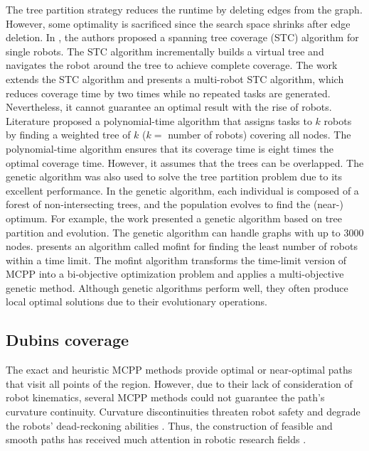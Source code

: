 \documentclass[journal,article,submit,pdftex,moreauthors]{Definitions/mdpi}
\begin{document}
The tree partition strategy reduces the runtime by deleting edges from the graph. However, some optimality is sacrificed since the search space shrinks after edge deletion. In \cite{gabriely2001spanning}, the authors proposed a spanning tree coverage (STC) algorithm for single robots. The STC algorithm incrementally builds a virtual tree and navigates the robot around the tree to achieve complete coverage. The work \cite{hazon2005redundancy} extends the STC algorithm and presents a multi-robot STC algorithm, which reduces coverage time by two times while no repeated tasks are generated. Nevertheless, it cannot guarantee an optimal result with the rise of robots. Literature \cite{zheng2005multi} proposed a polynomial-time algorithm that assigns tasks to $k$ robots by finding a weighted tree of $k$ ($k =$ number of robots) covering all nodes. The polynomial-time algorithm ensures that its coverage time is eight times the optimal coverage time. However, it assumes that the trees can be overlapped. The genetic algorithm was also used to solve the tree partition problem due to its excellent performance. In the genetic algorithm, each individual is composed of a forest of non-intersecting trees, and the population evolves to find the (near-) optimum. For example, the work \cite{c39} presented a genetic algorithm based on tree partition and evolution. The genetic algorithm can handle graphs with up to 3000 nodes.\cite{c1} presents an algorithm called mofint for finding the least number of robots within a time limit. The mofint algorithm transforms the time-limit version of MCPP into a bi-objective optimization problem and applies a multi-objective genetic method. Although genetic algorithms perform well, they often produce local optimal solutions due to their evolutionary operations.

\subsection{Dubins coverage}
The exact and heuristic MCPP methods provide optimal or near-optimal paths that visit all points of the region. However, due to their lack of consideration of robot kinematics, several MCPP methods could not guarantee the path's curvature continuity. Curvature discontinuities threaten robot safety and degrade the robots' dead-reckoning abilities \cite{wang2017curvature}\cite{vselek2022smooth}. Thus, the construction of feasible and smooth paths has received much attention in robotic research fields \cite{khan2017complete}.
\end{document}
